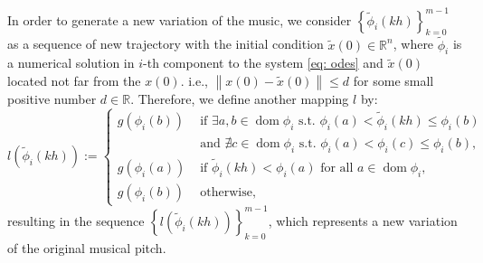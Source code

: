 \documentclass[11pt]{article}
\theoremstyle{definition}
\DeclareMathOperator{\dom}{dom}
\begin{document}

In order to generate a new variation of the music, we consider $ \left\{\tilde{\phi}_i(kh) \right\}_{k=0}^{m-1} $ as a sequence of new trajectory with the initial condition $\tilde{x}(0) \in \mathbb{R}^n$, where $\tilde{\phi}_i$ is a numerical solution in $i$-th component to the system \eqref{eq: odes} and $\tilde{x}(0)$ located not far from the $x(0)$. i.e., $ \left\lVert x(0) - \tilde{x}(0) \right\rVert \leq d$ for some small positive number $d \in \mathbb{R}$. 
Therefore, we define another mapping $l$ by: 
\begin{equation} \label{eq: lmap}
l\left(\tilde{\phi}_i(kh)\right) := 
\begin{cases}
  g(\phi_i(b)) & \text{ if }\exists a, b \in \dom{\phi_i} \text{ s.t. } \phi_i(a) < \tilde{\phi}_i(kh) \leq \phi_i(b) \\
  & \text{ and } \nexists c \in \dom{\phi_i} \text{ s.t. } \phi_i(a) < \phi_i(c) \leq \phi_i(b), \\
  g(\phi_i(a)) & \text{ if } \tilde{\phi}_i(kh) < \phi_i(a) \text{ for all } a \in \dom{\phi_i}, \\
  g(\phi_i(b)) & \text{ otherwise},
\end{cases}
\end{equation}
resulting in the sequence $\left\{ l\left(\tilde{\phi}_i(kh)\right) \right\}_{k = 0}^{m - 1}$, which represents a new variation of the original musical pitch. 
\end{document}
